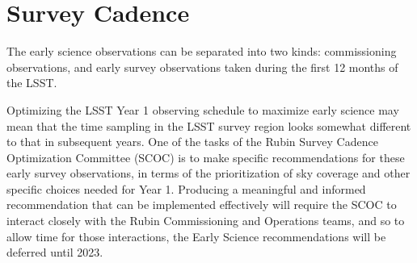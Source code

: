 \section{Survey Cadence}

The early science observations can be separated into two kinds: commissioning observations, and early survey observations taken during the first 12 months of the LSST.

Optimizing the LSST Year 1 observing schedule to maximize early science may mean that the time sampling in the LSST survey region looks somewhat different to that in subsequent years.
One of the tasks of the Rubin Survey Cadence Optimization Committee (SCOC) is to make specific recommendations for these early survey observations, in terms of the prioritization of sky coverage and other specific choices needed for Year 1.
Producing a meaningful and informed recommendation that can be implemented effectively will require the SCOC to interact closely with the Rubin Commissioning and Operations teams, and so to allow time for those interactions, the Early Science recommendations will be deferred until 2023. 
